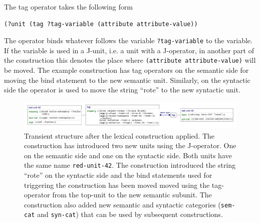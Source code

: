 \begin{description}
The tag operator takes the following form
\begin{footnotesize}
\begin{Verbatim}[commandchars=\\\{\}]
(?unit (tag ?tag-variable (attribute attribute-value))
\end{Verbatim}
\end{footnotesize}
The operator binds whatever follows the variable {\footnotesize\tt ?tag-variable}
to the variable. If the variable is used in a J-unit, i.e. a unit with a J-operator, 
in another part of the construction this denotes the place where 
{\footnotesize\tt (attribute attribute-value)} will be moved. The example
construction has tag operators on the semantic side for moving the
bind statement to the new semantic unit. Similarly, on the syntactic side the
operator is used to move the string ``rote'' to the new syntactic unit.
\end{description}

\begin{figure}
\begin{center}
\includegraphics[width=1.0\columnwidth]{figs/simple-grammar-after-red-application}
\end{center}
\caption[Transient structure after lexical constructions applied]{
Transient structure after the lexical construction applied. The construction
has introduced two new units using the J-operator. 
One on the semantic side and one on the syntactic side.
Both units have the same name {\footnotesize\tt red-unit-42}. The construction introduced
the string ``rote'' on the syntactic side and the bind statements used for 
triggering the construction has been moved moved using the tag-operator 
from the top-unit to the new semantic subunit.
The construction also added new semantic and syntactic categories
({\footnotesize\tt sem-cat} and {\footnotesize\tt syn-cat}) that can be used by 
subsequent constructions.}
\label{f:after-red-cxn}
\end{figure}



